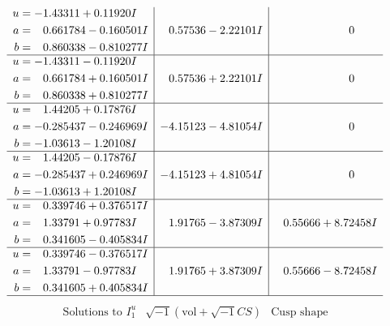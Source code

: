 \documentclass[1p]{elsarticle_modified}
\theoremstyle{definition}
\newcommand{\I}{\sqrt{-1}}
\begin{document}
$$\begin{array}{c|c|c}
\begin{aligned}
u &= -1.43311 + 0.11920 I \\
a &= \phantom{-}0.661784 - 0.160501 I \\
b &= \phantom{-}0.860338 - 0.810277 I\end{aligned}
 & \phantom{-}0.57536 - 2.22101 I & \phantom{-0.000000 } 0 \\ \hline\begin{aligned}
u &= -1.43311 - 0.11920 I \\
a &= \phantom{-}0.661784 + 0.160501 I \\
b &= \phantom{-}0.860338 + 0.810277 I\end{aligned}
 & \phantom{-}0.57536 + 2.22101 I & \phantom{-0.000000 } 0 \\ \hline\begin{aligned}
u &= \phantom{-}1.44205 + 0.17876 I \\
a &= -0.285437 - 0.246969 I \\
b &= -1.03613 - 1.20108 I\end{aligned}
 & -4.15123 - 4.81054 I & \phantom{-0.000000 } 0 \\ \hline\begin{aligned}
u &= \phantom{-}1.44205 - 0.17876 I \\
a &= -0.285437 + 0.246969 I \\
b &= -1.03613 + 1.20108 I\end{aligned}
 & -4.15123 + 4.81054 I & \phantom{-0.000000 } 0 \\ \hline\begin{aligned}
u &= \phantom{-}0.339746 + 0.376517 I \\
a &= \phantom{-}1.33791 + 0.97783 I \\
b &= \phantom{-}0.341605 - 0.405834 I\end{aligned}
 & \phantom{-}1.91765 - 3.87309 I & \phantom{-}0.55666 + 8.72458 I \\ \hline\begin{aligned}
u &= \phantom{-}0.339746 - 0.376517 I \\
a &= \phantom{-}1.33791 - 0.97783 I \\
b &= \phantom{-}0.341605 + 0.405834 I\end{aligned}
 & \phantom{-}1.91765 + 3.87309 I & \phantom{-}0.55666 - 8.72458 I\\
 \hline 
 \end{array}$$\newpage$$\begin{array}{c|c|c}  
\text{Solutions to }I^u_{1}& \I (\text{vol} + \sqrt{-1}CS) & \text{Cusp shape}\\

\end{array}$$
\end{document}
